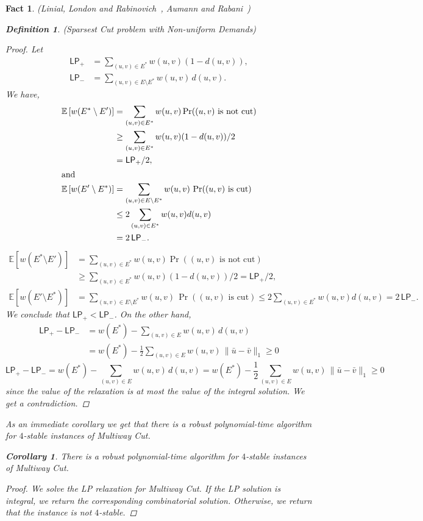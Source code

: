 \documentclass[twoside,leqno,twocolumn]{article}
\newcommand {\Exp}       {\mathbb{E}}
\newcommand {\E}     [1] {\Exp\left[#1\right]}
\newtheorem{corollary}[theorem]{Corollary}
\newtheorem{Definition}[theorem]{Definition}
\newtheorem{fact}[theorem]{Fact}
\begin{document}
\begin{fact}{\sc (Linial, London and Rabinovich~\cite{LLR}, Aumann and Rabani~\cite{AR})}
\begin{Definition} {\sc (Sparsest Cut problem with Non-uniform Demands)}
\begin{proof}
Let 
\begin{align*}
\mathsf{LP}_{+} &= \sum_{(u,v)\in E^*} w(u,v) (1 - d(u,v)),\\
\mathsf{LP}_{-} &= \sum_{(u,v)\in E\setminus E^*} w(u,v) \, d(u,v).
\end{align*}
We have, 
\ifSODA
\begin{align*}
\E{w(E^*\setminus E')} &= \sum_{(u,v) \in E^*} w(u,v) \Pr((u,v) \text{ is not cut}) \\
&
\geq 
\sum_{(u,v) \in E^*} w(u,v) (1-d(u,v))/2 \\&
= \mathsf{LP}_{+}/2,\\
\intertext{and}
\E{w(E'\setminus E^*)} &= \sum_{(u,v) \in E\setminus E^*} w(u,v) \, \Pr((u, v) \text{ is cut}) \\
&\leq 
2\sum_{(u,v) \in E^*} w(u,v) d(u,v) \\
&= 2\,\mathsf{LP}_{-}.
\end{align*}
\else
\begin{align*}
\E{w(E^*\setminus E')} &= \sum_{(u,v) \in E^*} w(u,v) \Pr((u,v) \text{ is not cut}) \\
&
\geq 
\sum_{(u,v) \in E^*} w(u,v) (1-d(u,v))/2 = \mathsf{LP}_{+}/2,\\
\E{w(E'\setminus E^*)} &= \sum_{(u,v) \in E\setminus E^*} w(u,v) \, \Pr((u, v) \text{ is cut}) \leq 
2\sum_{(u,v) \in E^*} w(u,v) d(u,v) = 2\,\mathsf{LP}_{-}.
\end{align*}
\fi
We conclude that $\mathsf{LP}_{+} < \mathsf{LP}_{-}$.
On the other hand,
\ifSODA
\begin{align*}
\mathsf{LP}_{+} - \mathsf{LP}_{-} &= w(E^*) - \sum_{(u,v) \in E} w(u,v) \, d(u,v) \\
&= w(E^*) - \frac{1}{2}\sum_{(u,v) \in E} w(u,v) \, \|\bar u-\bar v\|_1 
\geq 0
\end{align*}
\else
$$\mathsf{LP}_{+} - \mathsf{LP}_{-} = w(E^*) - \sum_{(u,v) \in E} w(u,v) \, d(u,v) = w(E^*) - \frac{1}{2}\sum_{(u,v) \in E} w(u,v) \, \|\bar u-\bar v\|_1 \geq 0$$
\fi
since the value of the relaxation is at most the value of the integral solution. We get a contradiction.
\end{proof}

As an immediate corollary we get that there is a robust polynomial-time algorithm for $4$-stable instances of Multiway Cut.
\begin{corollary}
There is a robust polynomial-time algorithm for $4$-stable instances of Multiway Cut.
\end{corollary}
\begin{proof}
We solve the LP relaxation for Multiway Cut. If the LP solution is integral, we return the corresponding combinatorial solution. Otherwise,
we return that the instance is not $4$-stable.
\end{proof} 

\end{Definition}
\end{fact}
\end{document}
